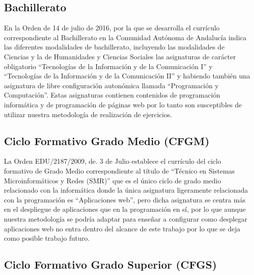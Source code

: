 \subsection {Bachillerato}

En la Orden de 14 de julio de 2016, por la que se desarrolla el currículo correspondiente al Bachillerato en la Comunidad Autónoma de Andalucía indica las diferentes modalidades de bachillerato, incluyendo las modalidades de Ciencias y la de Humanidades y Ciencias Sociales las asignaturas de carácter obligatorio ``Tecnologías de la Información y de la Comunicación I'' y ``Tecnologías de la Información y de la Comunicación II'' y habiendo también una asignatura de libre configuración autonómica llamada ``Programación y Computación''. Estas asignaturas contienen contenidos de programación informática y de programación de páginas web por lo tanto son susceptibles de utilizar nuestra metodología de realización de ejercicios.

\subsection {Ciclo Formativo Grado Medio (CFGM)}

La Orden EDU/2187/2009, de. 3 de Julio establece el currículo del ciclo formativo de Grado Medio correspondiente al título de ``Técnico en Sistemas Microinformáticos y Redes (SMR)'' que es el único ciclo de grado medio relacionado con la informática donde la única asignatura ligeramente relacionada con la programación es ``Aplicaciones web'', pero dicha asignatura se centra más en el despliegue de aplicaciones que en la programación en sí, por lo que aunque nuestra metodología se podría adaptar para enseñar a configurar como desplegar aplicaciones web no entra dentro del alcance de este trabajo por lo que se deja como posible trabajo futuro.

\subsection {Ciclo Formativo Grado Superior (CFGS)}

